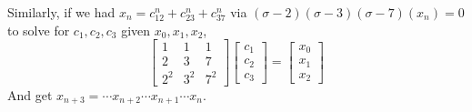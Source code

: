 \documentclass{article}
\theoremstyle{plain}
\theoremstyle{remark}
\begin{document}
Similarly, if we had $x_n = c_12^n + c_23^n + c_37^n$
via $(\sigma - 2)(\sigma -3 )(\sigma - 7)(x_n) = 0$
to solve for $c_1,c_2,c_3$ given $x_0,x_1,x_2$,
\[
	\begin{bmatrix}
		1 & 1 & 1\\ 2 & 3 & 7\\ 2^2 & 3^2 & 7^2
	\end{bmatrix}
	\begin{bmatrix} c_1 \\ c_2 \\ c_3 \end{bmatrix}
	= \begin{bmatrix} x_0 \\ x_1 \\ x_2 \end{bmatrix}
\]
And get $x_{n+3} = \cdots x_{n+2} \cdots x_{n+1} \cdots x_n$.
\end{document}

